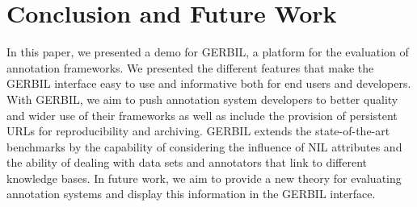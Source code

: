 \section{Conclusion and Future Work}
\label{cha333:sec:conclusion}
In this paper, we presented a demo for GERBIL, a platform for the evaluation of annotation frameworks. We presented the different features that make the GERBIL interface easy to use and informative both for end users and developers. 
With GERBIL, we aim to push annotation system developers to better quality and wider use of their frameworks as well as include the provision of persistent URLs for reproducibility and archiving.
GERBIL extends the state-of-the-art benchmarks by the capability of considering the influence of NIL attributes and the ability of dealing with data sets and annotators that link to different knowledge bases. In future work, we aim to provide a new theory for evaluating annotation systems and display this information in the GERBIL interface.

